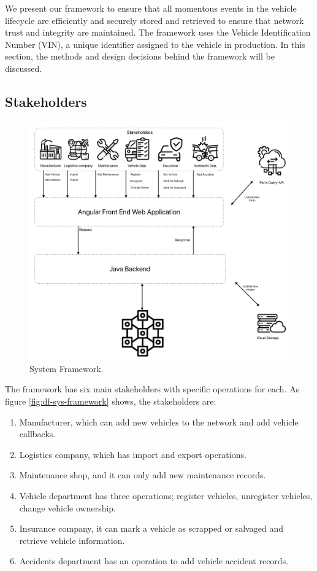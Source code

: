 We present our framework to ensure that all momentous events in the vehicle lifecycle are efficiently and securely stored and retrieved to
ensure that network trust and integrity are maintained. The framework uses the Vehicle Identification Number (VIN), a unique identifier
assigned to the vehicle in production. In this section, the methods and design decisions behind the framework will be discussed.

\subsection{Stakeholders}
\begin{figure}[H]
	\centering
	\includegraphics[width=\linewidth]{figures/sys-framework}
	\caption{System Framework.}
	\label{fig:sys-framework}
\end{figure}
The framework has six main stakeholders with specific operations for each. As figure \ref{fig:df-sys-framework} shows, the stakeholders are:
\begin{enumerate}
	\item Manufacturer, which can add new vehicles to the network and add vehicle callbacks.
	\item Logistics company, which has import and export operations.
	\item Maintenance shop, and it can only add new maintenance records.
	\item Vehicle department has three operations; register vehicles, unregister vehicles, change vehicle ownership.
	\item Insurance company, it can mark a vehicle as scrapped or salvaged and retrieve vehicle information.
	\item Accidents department has an operation to add vehicle accident records.
\end{enumerate}
